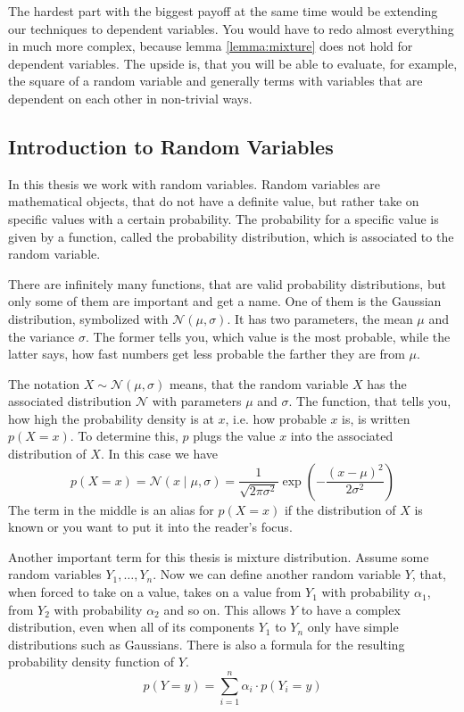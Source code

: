 \documentclass[11pt,a4paper]{book}
\begin{document}
The hardest part with the biggest payoff at the same time would be extending our
techniques to dependent variables. You would have to redo almost everything in
much more complex, because lemma \ref{lemma:mixture} does not hold for dependent
variables. The upside is, that you will be able to evaluate, for example, the
square of a random variable and generally terms with variables that are
dependent on each other in non-trivial ways.

\begin{appendices}
  \chapter{Introduction to Random Variables}
  \label{ch:basics}

  In this thesis we work with random variables. Random variables are
  mathematical objects, that do not have a definite value, but rather take on
  specific values with a certain probability. The probability for a specific
  value is given by a function, called the probability distribution, which is
  associated to the random variable.

  There are infinitely many functions, that are valid probability distributions,
  but only some of them are important and get a name. One of them is the
  Gaussian distribution, symbolized with $\mathcal{N}(\mu, \sigma)$. It has two
  parameters, the mean $\mu$ and the variance $\sigma$. The former tells you,
  which value is the most probable, while the latter says, how fast numbers get
  less probable the farther they are from $\mu$.

  The notation $X \sim \mathcal{N}(\mu, \sigma)$ means, that the random variable
  $X$ has the associated distribution $\mathcal{N}$ with parameters $\mu$ and
  $\sigma$. The function, that tells you, how high the probability density is at
  $x$, i.e. how probable $x$ is, is written $p(X = x)$. To determine this, $p$
  plugs the value $x$ into the associated distribution of $X$. In this case we
  have
  \begin{equation*}
    p(X = x) = \mathcal{N}\left( x \mid \mu, \sigma \right) = \frac{1}{\sqrt{2 \pi \sigma^{2}}} \exp \left( - \frac{(x - \mu)^{2}}{2\sigma^{2}} \right)
  \end{equation*}
  The term in the middle is an alias for $p(X = x)$ if the distribution of $X$
  is known or you want to put it into the reader's focus.

  Another important term for this thesis is mixture distribution. Assume some
  random variables $Y_{1}, \dots, Y_{n}$. Now we can define another random
  variable $Y$, that, when forced to take on a value, takes on a value from
  $Y_{1}$ with probability $\alpha_{1}$, from $Y_{2}$ with probability
  $\alpha_{2}$ and so on. This allows $Y$ to have a complex distribution, even
  when all of its components $Y_{1}$ to $Y_{n}$ only have simple distributions
  such as Gaussians. There is also a formula for the resulting probability
  density function of $Y$.
  \begin{equation*}
    p(Y = y) = \sum_{i = 1}^{n} \alpha_{i} \cdot p(Y_{i} = y)
  \end{equation*}


\end{appendices}
\end{document}
